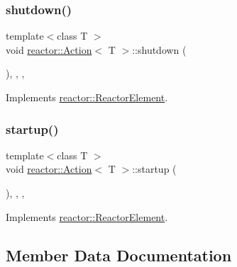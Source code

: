 \subsubsection{\texorpdfstring{shutdown()}{shutdown()}}
{\footnotesize\ttfamily template$<$class T $>$ \\
void \hyperlink{classreactor_1_1Action}{reactor\+::\+Action}$<$ T $>$\+::shutdown (\begin{DoxyParamCaption}{ }\end{DoxyParamCaption})\hspace{0.3cm}{\ttfamily [inline]}, {\ttfamily [final]}, {\ttfamily [override]}, {\ttfamily [virtual]}}



Implements \hyperlink{classreactor_1_1ReactorElement_a8fce084bef582156979ebba56737e907}{reactor\+::\+Reactor\+Element}.

\mbox{\label{classreactor_1_1Action_a60364e6742fb14dd515ff355abc5f3db}} 
\subsubsection{\texorpdfstring{startup()}{startup()}}
{\footnotesize\ttfamily template$<$class T $>$ \\
void \hyperlink{classreactor_1_1Action}{reactor\+::\+Action}$<$ T $>$\+::startup (\begin{DoxyParamCaption}{ }\end{DoxyParamCaption})\hspace{0.3cm}{\ttfamily [inline]}, {\ttfamily [final]}, {\ttfamily [override]}, {\ttfamily [virtual]}}



Implements \hyperlink{classreactor_1_1ReactorElement_a8cb574cb20ff963903ad905fb0a157e3}{reactor\+::\+Reactor\+Element}.



\subsection{Member Data Documentation}
\mbox{\label{classreactor_1_1Action_a0002a99457bb578aa89854ad71db4fb2}} 
